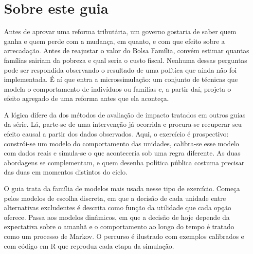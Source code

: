 \documentclass[12pt, a4paper, openany]{book}
\numberwithin{equation}{chapter}
\numberwithin{table}{chapter}
\numberwithin{figure}{chapter}
\theoremstyle{break}
\begin{document}
\vfill


\newpage

\thispagestyle{empty}
\section*{Sobre este guia}
Antes de aprovar uma reforma tribut\'aria, um governo gostaria de saber quem
ganha e quem perde com a mudan\c{c}a, em quanto, e com que efeito sobre a
arrecada\c{c}\~ao. Antes de reajustar o valor do Bolsa Fam\'ilia, convém estimar
quantas fam\'ilias sairiam da pobreza e qual seria o custo fiscal. Nenhuma
dessas perguntas pode ser respondida observando o resultado de uma pol\'itica
que ainda n\~ao foi implementada. \'E a\'i que entra a microssimula\c{c}\~ao: um
conjunto de t\'ecnicas que modela o comportamento de indiv\'iduos ou fam\'ilias e,
a partir da\'i, projeta o efeito agregado de uma reforma antes que ela aconte\c{c}a.

A l\'ogica difere da dos m\'etodos de avalia\c{c}\~ao de impacto tratados em outros
guias da s\'erie. L\'a, parte-se de uma interven\c{c}\~ao j\'a ocorrida e procura-se
recuperar seu efeito causal a partir dos dados observados. Aqui, o exerc\'icio \'e
prospectivo: constr\'oi-se um modelo do comportamento das unidades, calibra-se
esse modelo com dados reais e simula-se o que aconteceria sob uma regra
diferente. As duas abordagens se complementam, e quem desenha pol\'itica
p\'ublica costuma precisar das duas em momentos distintos do ciclo.

O guia trata da fam\'ilia de modelos mais usada nesse tipo de exerc\'icio. Come\c{c}a
pelos modelos de escolha discreta, em que a decis\~ao de cada unidade entre
alternativas excludentes \'e descrita como fun\c{c}\~ao da utilidade que cada op\c{c}\~ao
oferece. Passa aos modelos din\^amicos, em que a decis\~ao de hoje depende da
expectativa sobre o amanh\~a e o comportamento ao longo do tempo \'e tratado como
um processo de Markov. O percurso \'e ilustrado com exemplos calibrados e com
c\'odigo em R que reproduz cada etapa da simula\c{c}\~ao.
\end{document}
